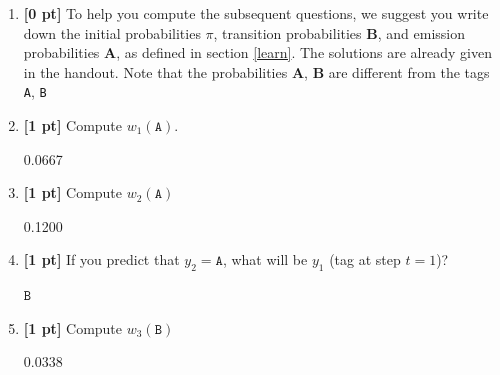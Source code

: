 \documentclass{article}
\begin{document}
\begin{enumerate}

    \item \textbf{[0 pt]} To help you compute the subsequent questions, we suggest you write down the initial probabilities $\pi$, transition probabilities $\textbf{B}$, and emission probabilities $\textbf{A}$, as defined in section \ref{learn}. The solutions are already given in the handout. Note that the probabilities $\textbf{A}$, $\textbf{B}$ are different from the tags \texttt{A}, \texttt{B}
    
    \item \textbf{[1 pt]} Compute $w_1(\texttt{A})$.
    
    \begin{tcolorbox}[fit,height=1cm, width=2cm, blank, borderline={1pt}{-2pt}]
            \begin{center}\huge0.0667\end{center}
        \end{tcolorbox}
    
    \item \textbf{[1 pt]} Compute $w_2(\texttt{A})$
    
    \begin{tcolorbox}[fit,height=1cm, width=2cm, blank, borderline={1pt}{-2pt}]
            \begin{center}\huge0.1200\end{center}
        \end{tcolorbox}
    
    \item \textbf{[1 pt]} If you predict that $y_2 = \texttt{A}$, what will be $y_1$ (tag at step $t = 1$)? 
    
    \begin{tcolorbox}[fit,height=1cm, width=2cm, blank, borderline={1pt}{-2pt}]
            \begin{center}\huge$\texttt{B}$\end{center}
        \end{tcolorbox}
    
    \item \textbf{[1 pt]} Compute $w_3(\texttt{B})$
    
    \begin{tcolorbox}[fit,height=1cm, width=2cm, blank, borderline={1pt}{-2pt}]
            \begin{center}\huge0.0338\end{center}
        \end{tcolorbox}
    

\end{enumerate}
\end{document}
